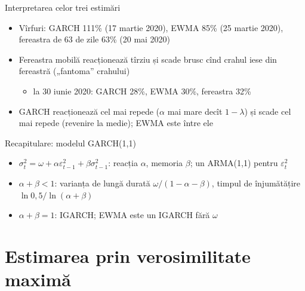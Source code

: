 \begin{frame}{Interpretarea celor trei estimări}
\itemsize{\small}
\begin{itemize}
    \item Vîrfuri: GARCH 111\% (17 martie 2020), EWMA 85\% (25 martie 2020), fereastra de 63 de zile 63\% (20 mai 2020)
    \item Fereastra mobilă reacționează tîrziu și scade brusc cînd crahul iese din fereastră („fantoma” crahului)
    \begin{itemize}
        \item la 30 iunie 2020: GARCH 28\%, EWMA 30\%, fereastra 32\%
    \end{itemize}
    \item GARCH reacționează cel mai repede ($\alpha$ mai mare decît $1 - \lambda$) și scade cel mai repede (revenire la medie); EWMA este între ele
\end{itemize}
\end{frame}

\begin{frame}{Recapitulare: modelul GARCH(1,1)}
\itemsize{\small}
\begin{itemize}
    \item $\sigma_t^2 = \omega + \alpha\varepsilon_{t-1}^2 + \beta\sigma_{t-1}^2$: reacția $\alpha$, memoria $\beta$; un ARMA(1,1) pentru $\varepsilon_t^2$
    \item $\alpha + \beta < 1$: varianța de lungă durată $\omega/(1 - \alpha - \beta)$, timpul de înjumătățire $\ln 0{,}5/\ln(\alpha + \beta)$
    \item $\alpha + \beta = 1$: IGARCH; EWMA este un IGARCH fără $\omega$
\end{itemize}
\end{frame}


\section{Estimarea prin verosimilitate maximă}

